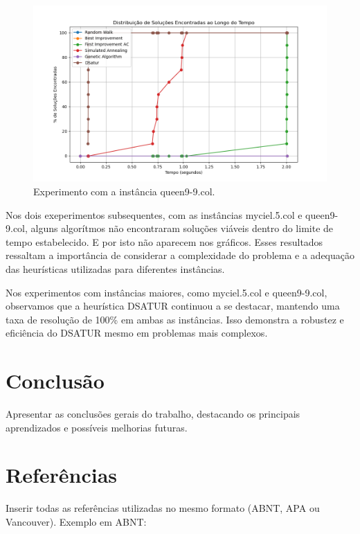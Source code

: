 \documentclass[12pt,a4paper]{article}
\begin{document}
\begin{figure}[H]
    \centering
    \includegraphics[width=1\textwidth]{./img/output-queen9-9.png}
    \caption{Experimento com a instância queen9-9.col.}
    \label{fig:experimento-queen9-9}
\end{figure}

Nos dois exeperimentos subsequentes, com as instâncias myciel.5.col e queen9-9.col, alguns algorítmos não encontraram soluções viáveis dentro do limite de tempo estabelecido. E por isto não aparecem nos gráficos. Esses resultados ressaltam a importância de considerar a complexidade do problema e a adequação das heurísticas utilizadas para diferentes instâncias.

Nos experimentos com instâncias maiores, como myciel.5.col e queen9-9.col, observamos que a heurística DSATUR continuou a se destacar, mantendo uma taxa de resolução de 100\% em ambas as instâncias. Isso demonstra a robustez e eficiência do DSATUR mesmo em problemas mais complexos.


\section{Conclusão}
Apresentar as conclusões gerais do trabalho, destacando os principais aprendizados e possíveis melhorias futuras.

\section*{Referências}

Inserir todas as referências utilizadas no mesmo formato (ABNT, APA ou Vancouver).  
Exemplo em ABNT:

\end{document}
